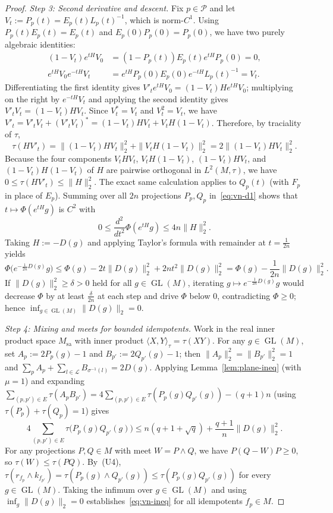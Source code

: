 \documentclass[11pt]{article}
\theoremstyle{definition}
\theoremstyle{remark}
\numberwithin{equation}{section}
\DeclareMathOperator{\GL}{GL}
\newcommand{\PP}{\mathcal{P}}
\newcommand{\LL}{\mathcal{L}}
\newcommand{\1}{\mathbf{1}}
\begin{document}
\begin{proof}
\emph{Step 3: Second derivative and descent.}
Fix $p \in \PP$ and let $V_t := P_p(t) = E_p(t) L_p(t)^{-1}$, which is norm-$C^1$. Using $P_p(t) E_p(t) = E_p(t)$ and $E_p(0) P_p(0) = P_p(0)$, we have two purely algebraic identities:
\begin{align*}
(1 - V_t) e^{tH} V_0 &= (1 - P_p(t)) E_p(t) e^{tH} P_p(0) = 0, \\
e^{tH} V_0 e^{-tH} V_t &= e^{tH} P_p(0) E_p(0) e^{-tH} L_p(t)^{-1} = V_t.
\end{align*}
Differentiating the first identity gives $V'_t e^{tH} V_0 = (1 - V_t) H e^{tH} V_0$; multiplying on the right by $e^{-tH} V_t$ and applying the second identity gives $V'_t V_t = (1 - V_t) H V_t$. Since $V_t^* = V_t$ and $V_t^2 = V_t$, we have $V'_t = V'_t V_t + (V'_t V_t)^* = (1 - V_t) H V_t + V_t H (1 - V_t)$. Therefore, by traciality of $\tau$,
\[
\tau(H V'_t) = \|(1 - V_t) H V_t\|_2^2 + \|V_t H (1 - V_t)\|_2^2 = 2\|(1 - V_t) H V_t\|_2^2.
\]
Because the four components $V_t H V_t$, $V_t H(1 - V_t)$, $(1 - V_t) H V_t$, and $(1 - V_t) H(1 - V_t)$ of $H$ are pairwise orthogonal in $L^2(M, \tau)$, we have $0 \le \tau(H V'_t) \le \|H\|_2^2$. The exact same calculation applies to $Q_p(t)$ (with $F_p$ in place of $E_p$). Summing over all $2n$ projections $P_p, Q_p$ in~\eqref{eq:vn-d1} shows that $t \mapsto \Phi(e^{tH} g)$ is $C^2$ with
\[
0 \le \frac{d^2}{dt^2}\Phi(e^{tH} g) \le 4n \|H\|_2^2.
\]
Taking $H := -D(g)$ and applying Taylor's formula with remainder at $t = \frac{1}{2n}$ yields
\[
\Phi\bigl(e^{-\frac{1}{2n} D(g)} g\bigr)
\le \Phi(g) - 2t \|D(g)\|_2^2 + 2n t^2 \|D(g)\|_2^2
= \Phi(g) - \frac{1}{2n}\|D(g)\|_2^2.
\]
If $\|D(g)\|_2^2 \ge \delta > 0$ held for all $g \in \GL(M)$, iterating $g \mapsto e^{-\frac{1}{2n} D(g)} g$ would decrease $\Phi$ by at least $\frac{\delta}{2n}$ at each step and drive $\Phi$ below $0$, contradicting $\Phi \ge 0$; hence $\inf_{g \in \GL(M)} \|D(g)\|_2 = 0$.

\emph{Step 4: Mixing and meets for bounded idempotents.}
Work in the real inner product space $M_{\mathrm{sa}}$ with inner product $\langle X, Y \rangle_\tau = \tau(XY)$. For any $g \in \GL(M)$, set $A_p := 2P_p(g) - 1$ and $B_{p'} := 2Q_{p'}(g) - 1$; then ${\|A_p\|_2^2 = \|B_{p'}\|_2^2 = 1}$ and $\sum_p A_p + \sum_{l \in \LL} B_{\sigma^{-1}(l)} = 2D(g)$. Applying Lemma~\ref{lem:plane-ineq} (with $\mu = 1$) and expanding $\sum_{(p,p') \in E} \tau(A_p B_{p'}) = 4\sum_{(p,p') \in E} \tau(P_p(g) Q_{p'}(g)) - (q+1)n$ (using $\tau(P_p) + \tau(Q_p) = 1$) gives
\[
4\sum_{(p,p') \in E} \tau\bigl(P_p(g) Q_{p'}(g)\bigr) \le n(q + 1 + \sqrt{q}) + \frac{q + 1}{n}\|D(g)\|_2^2.
\]
For any projections $P, Q \in M$ with meet $W = P \wedge Q$, we have $P(Q - W)P \ge 0$, so $\tau(W) \le \tau(PQ)$. By~(U4), $\tau(r_{f_p} \wedge k_{f_{p'}}) = \tau(P_p(g) \wedge Q_{p'}(g)) \le \tau(P_p(g) Q_{p'}(g))$ for every $g \in \GL(M)$. Taking the infimum over $g \in \GL(M)$ and using $\inf_g \|D(g)\|_2 = 0$ establishes~\eqref{eq:vn-ineq} for all idempotents $f_p \in M$.


\end{proof}
\end{document}
